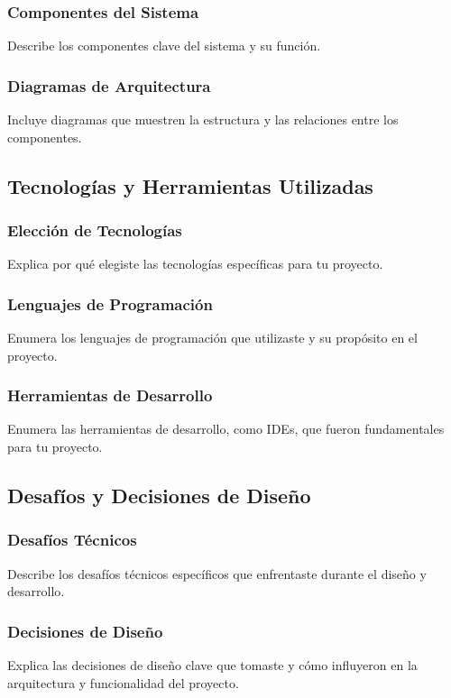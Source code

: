 \subsubsection{Componentes del Sistema}
Describe los componentes clave del sistema y su función.

\subsubsection{Diagramas de Arquitectura}
Incluye diagramas que muestren la estructura y las relaciones entre los componentes.

\subsection{Tecnologías y Herramientas Utilizadas}

\subsubsection{Elección de Tecnologías}
Explica por qué elegiste las tecnologías específicas para tu proyecto.

\subsubsection{Lenguajes de Programación}
Enumera los lenguajes de programación que utilizaste y su propósito en el proyecto.

\subsubsection{Herramientas de Desarrollo}
Enumera las herramientas de desarrollo, como IDEs, que fueron fundamentales para tu proyecto.

\subsection{Desafíos y Decisiones de Diseño}

\subsubsection{Desafíos Técnicos}
Describe los desafíos técnicos específicos que enfrentaste durante el diseño y desarrollo.

\subsubsection{Decisiones de Diseño}
Explica las decisiones de diseño clave que tomaste y cómo influyeron en la arquitectura y funcionalidad del proyecto.

